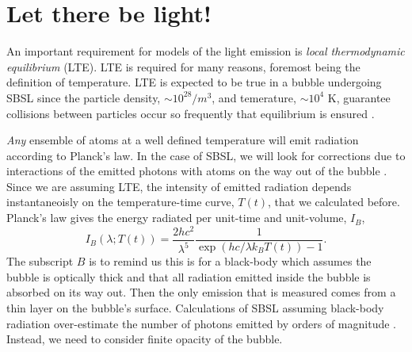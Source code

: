 \documentclass[prb,aps,nofootinbib,superscriptaddress,floatfix]{revtex4-2}
\begin{document}
\section{Let there be light!}
An important requirement for models of the light emission is \emph{local thermodynamic equilibrium} (LTE). LTE is required for many reasons, foremost being the definition of temperature. LTE is expected to be true in a bubble undergoing SBSL since the particle density, $\sim 10^{28}/m^3$, and temerature, $\sim 10^4$ K, guarantee collisions between particles occur so frequently that equilibrium is ensured \cite{brenner2002single,hilgenfeldt1999sonoluminescence,yasui1999mechanism}.

\emph{Any} ensemble of atoms at a well defined temperature will emit radiation according to Planck's law. In the case of SBSL, we will look for corrections due to interactions of the emitted photons with atoms on the way out of the bubble \cite{hilgenfeldt1999sonoluminescence}. Since we are assuming LTE, the intensity of emitted radiation depends instantaneoisly on the temperature-time curve, $T(t)$, that we calculated before. Planck's law gives the energy radiated per unit-time and unit-volume, $I_B$, \cite{schroeder1999introduction}
\begin{equation}
    I_{B}(\lambda;T(t))=\frac{2 h c^2}{\lambda^5}\frac{1}{\exp(hc/\lambda k_B T(t))-1}.
\end{equation}
The subscript $B$ is to remind us this is for a black-body which assumes the bubble is optically thick and that all radiation emitted inside the bubble is absorbed on its way out. Then the only emission that is measured comes from a thin layer on the bubble's surface. Calculations of SBSL assuming black-body radiation over-estimate the number of photons emitted by orders of magnitude \cite{hilgenfeldt1999simple,brenner2002single}. Instead, we need to consider finite opacity of the bubble.
\end{document}
